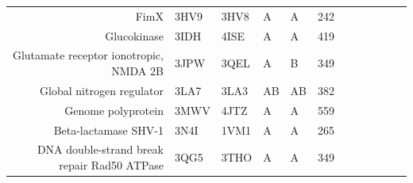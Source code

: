 \begin{table}
\begin{scriptsize}
\begin{tabular}{rrrrrrrrrrrr}
\multicolumn{1}{r}{FimX} & \multicolumn{1}{l}{3HV9} & \multicolumn{1}{l}{3HV8} & \multicolumn{1}{l}{A} & \multicolumn{1}{l}{A} & 242   & \cellcolor[rgb]{ .573,  .816,  .314}  & \cellcolor[rgb]{ .573,  .816,  .314}  & \cellcolor[rgb]{ .573,  .816,  .314}  & \cellcolor[rgb]{ .573,  .816,  .314}  & \cellcolor[rgb]{ .573,  .816,  .314}  & \cellcolor[rgb]{ .573,  .816,  .314}  \\
\multicolumn{1}{r}{Glucokinase} & \multicolumn{1}{l}{3IDH} & \multicolumn{1}{l}{4ISE} & \multicolumn{1}{l}{A} & \multicolumn{1}{l}{A} & 419   & \cellcolor[rgb]{ 1,  .494,  .475}  & \cellcolor[rgb]{ 1,  .494,  .475}  & \cellcolor[rgb]{ 1,  .494,  .475}  & \cellcolor[rgb]{ .573,  .816,  .314}  & \cellcolor[rgb]{ .573,  .816,  .314}  & \cellcolor[rgb]{ .573,  .816,  .314}  \\
\multicolumn{1}{r}{Glutamate receptor ionotropic, NMDA 2B} & \multicolumn{1}{l}{3JPW} & \multicolumn{1}{l}{3QEL} & \multicolumn{1}{l}{A} & \multicolumn{1}{l}{B} & 349   & \cellcolor[rgb]{ 1,  .494,  .475}  & \cellcolor[rgb]{ 1,  .494,  .475}  & \cellcolor[rgb]{ 1,  .494,  .475}  & \cellcolor[rgb]{ 1,  .494,  .475}  & \cellcolor[rgb]{ 1,  .494,  .475}  & \cellcolor[rgb]{ 1,  .494,  .475}  \\
\multicolumn{1}{r}{Global nitrogen regulator} & \multicolumn{1}{l}{3LA7} & \multicolumn{1}{l}{3LA3} & \multicolumn{1}{l}{AB} & \multicolumn{1}{l}{AB} & 382   & \cellcolor[rgb]{ 1,  .494,  .475}  & \cellcolor[rgb]{ 1,  .494,  .475}  & \cellcolor[rgb]{ .573,  .816,  .314}  & \cellcolor[rgb]{ 1,  .494,  .475}  & \cellcolor[rgb]{ 1,  .494,  .475}  & \cellcolor[rgb]{ 1,  .494,  .475}  \\
\multicolumn{1}{r}{Genome polyprotein} & \multicolumn{1}{l}{3MWV} & \multicolumn{1}{l}{4JTZ} & \multicolumn{1}{l}{A} & \multicolumn{1}{l}{A} & 559   & \cellcolor[rgb]{ 1,  .494,  .475}  & \cellcolor[rgb]{ 1,  .494,  .475}  & \cellcolor[rgb]{ 1,  .494,  .475}  & \cellcolor[rgb]{ 1,  .494,  .475}  & \cellcolor[rgb]{ 1,  .494,  .475}  & \cellcolor[rgb]{ 1,  .494,  .475}  \\
\multicolumn{1}{r}{Beta-lactamase SHV-1} & \multicolumn{1}{l}{3N4I} & \multicolumn{1}{l}{1VM1} & \multicolumn{1}{l}{A} & \multicolumn{1}{l}{A} & 265   & \cellcolor[rgb]{ .573,  .816,  .314}  & \cellcolor[rgb]{ .573,  .816,  .314}  & \cellcolor[rgb]{ 1,  .494,  .475}  & \cellcolor[rgb]{ .573,  .816,  .314}  & \cellcolor[rgb]{ .573,  .816,  .314}  & \cellcolor[rgb]{ .573,  .816,  .314}  \\
\multicolumn{1}{r}{DNA double-strand break repair Rad50 ATPase} & \multicolumn{1}{l}{3QG5} & \multicolumn{1}{l}{3THO} & \multicolumn{1}{l}{A} & \multicolumn{1}{l}{A} & 349   & \cellcolor[rgb]{ 1,  .494,  .475}  & \cellcolor[rgb]{ 1,  .494,  .475}  & \cellcolor[rgb]{ 1,  .494,  .475}  & \cellcolor[rgb]{ 1,  .494,  .475}  & \cellcolor[rgb]{ 1,  .494,  .475}  & \cellcolor[rgb]{ 1,  .494,  .475}  \\

\end{tabular}
\end{scriptsize}
\end{table}
